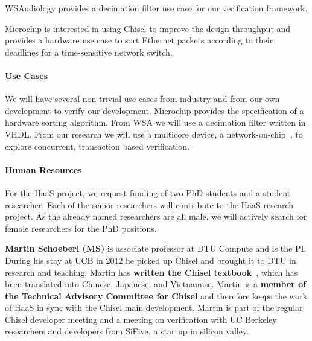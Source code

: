 \documentclass[fleqn,12pt]{article}
\begin{document}
WSAudiology provides a decimation filter use case for our verification framework.

Microchip is interested in using Chisel to improve the design throughput and
provides a hardware use case to sort Ethernet packets according to their deadlines
for a time-sensitive network switch.



\paragraph*{Use Cases}

We will have several non-trivial use cases from industry and from our own development to verify
our development.
Microchip provides the specification of a hardware sorting algorithm.
From WSA we will use a decimation filter written in VHDL.
From our research we will use a multicore device, a network-on-chip~\cite{s4noc:nocarc2019},
to explore concurrent, transaction based verification.

\paragraph*{Human Resources}

For the HaaS project, we request funding of two PhD students and a student researcher.
Each of the senior researchers will contribute to the HaaS research project.
%
%
As the already named researchers are all male, we will actively search
for female researchers for the PhD positions.


{\bf Martin Schoeberl (MS)} is associate professor at DTU Compute and is the PI.
During his stay
at UCB in 2012 he picked up Chisel and brought it to DTU in research and teaching.
Martin has {\bf written the Chisel textbook}~\cite{chisel:book}, which has been translated
into Chinese, Japanese, and Vietnamise. Martin is a {\bf member of the Technical Advisory Committee for
Chisel} and therefore keeps the work of HaaS in sync with the Chisel main development.
Martin is part of the regular Chisel developer meeting and a meeting on verification with
UC Berkeley researchers and developers from SiFive, a startup in silicon valley.
\end{document}
